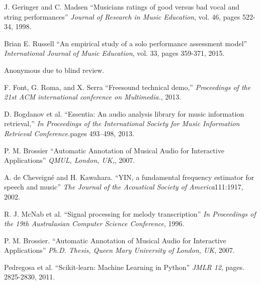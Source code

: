\documentclass{article}
\begin{document}
\begin{thebibliography}{citations}
%
J. Geringer and C. Madsen
``Musicians ratings of good versus bad vocal and string performances''
{\it Journal of Research in Music Education}, vol. 46, pages 522-34, 1998.

Brian E. Russell
``An empirical study of a solo performance assessment model''
{\it  International Journal of Music Education}, vol. 33, pages 359-371, 2015.

Anonymous due to blind review.

 F. Font, G. Roma, and X. Serra
``Freesound technical demo,''
{\it Proceedings of the 21st ACM international conference on Multimedia.}, 2013.

 D. Bogdanov et al.
``Essentia: An audio analysis library for music information retrieval,''
{\it  In Proceedings of the International Society for Music Information Retrieval Conference.}pages 493–498, 2013.

 P. M. Brossier
``Automatic Annotation of Musical Audio for Interactive Applications''
{\it QMUL, London, UK,}, 2007.

 A. de Cheveigné and H. Kawahara.
``YIN, a fundamental frequency estimator for speech and music''
{\it The Journal of the Acoustical Society of America}111:1917, 2002.

 R. J. McNab et al.
``Signal processing for melody transcription''
{\it In Proceedings of the 19th Australasian Computer Science Conference}, 1996.

P. M. Brossier.
``Automatic Annotation of Musical Audio for Interactive Applications''
{\it Ph.D. Thesis, Queen Mary University of London, UK}, 2007.

Pedregosa et al.
``Scikit-learn: Machine Learning in Python''
{\it JMLR 12}, pages. 2825-2830, 2011.


\end{thebibliography}
\end{document}
